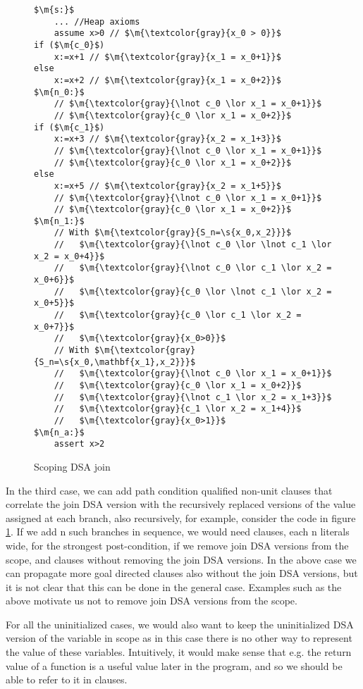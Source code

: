 \begin{figure}
\begin{lstlisting}
$\m{s:}$
	... //Heap axioms
	assume x>0 // $\m{\textcolor{gray}{x_0 > 0}}$
if ($\m{c_0}$)
	x:=x+1 // $\m{\textcolor{gray}{x_1 = x_0+1}}$
else
	x:=x+2 // $\m{\textcolor{gray}{x_1 = x_0+2}}$
$\m{n_0:}$
	// $\m{\textcolor{gray}{\lnot c_0 \lor x_1 = x_0+1}}$
	// $\m{\textcolor{gray}{c_0 \lor x_1 = x_0+2}}$
if ($\m{c_1}$)
	x:=x+3 // $\m{\textcolor{gray}{x_2 = x_1+3}}$
	// $\m{\textcolor{gray}{\lnot c_0 \lor x_1 = x_0+1}}$
	// $\m{\textcolor{gray}{c_0 \lor x_1 = x_0+2}}$
else
	x:=x+5 // $\m{\textcolor{gray}{x_2 = x_1+5}}$
	// $\m{\textcolor{gray}{\lnot c_0 \lor x_1 = x_0+1}}$
	// $\m{\textcolor{gray}{c_0 \lor x_1 = x_0+2}}$
$\m{n_1:}$
	// With $\m{\textcolor{gray}{S_n=\s{x_0,x_2}}}$
	//   $\m{\textcolor{gray}{\lnot c_0 \lor \lnot c_1 \lor x_2 = x_0+4}}$
	//   $\m{\textcolor{gray}{\lnot c_0 \lor c_1 \lor x_2 = x_0+6}}$
	//   $\m{\textcolor{gray}{c_0 \lor \lnot c_1 \lor x_2 = x_0+5}}$
	//   $\m{\textcolor{gray}{c_0 \lor c_1 \lor x_2 = x_0+7}}$
	//   $\m{\textcolor{gray}{x_0>0}}$
	// With $\m{\textcolor{gray}{S_n=\s{x_0,\mathbf{x_1},x_2}}}$
	//   $\m{\textcolor{gray}{\lnot c_0 \lor x_1 = x_0+1}}$
	//   $\m{\textcolor{gray}{c_0 \lor x_1 = x_0+2}}$
	//   $\m{\textcolor{gray}{\lnot c_1 \lor x_2 = x_1+3}}$
	//   $\m{\textcolor{gray}{c_1 \lor x_2 = x_1+4}}$
	//   $\m{\textcolor{gray}{x_0>1}}$
$\m{n_a:}$
	assert x>2
\end{lstlisting}
\caption{Scoping DSA join}
\label{snippet4.2.5}
\end{figure}

In the third case, we can add path condition qualified non-unit clauses that correlate the join DSA version with the recursively replaced versions of the value assigned at each branch, also recursively, for example, consider the code in figure \ref{snippet4.2.5}.
If we add n such branches in sequence, we would need  clauses, each n literals wide, for the strongest post-condition, if we remove join DSA versions from the scope, and  clauses without removing the join DSA versions.
In the above case we can propagate more goal directed clauses also without the join DSA versions, but it is not clear that this can be done in the general case. Examples such as the above motivate us not to remove join DSA versions from the scope.

For all the uninitialized cases, we would also want to keep the uninitialized DSA version of the variable in scope as in this case there is no other way to represent the value of these variables. 
Intuitively, it would make sense that e.g. the return value of a function is a useful value later in the program, and so we should be able to refer to it in clauses.


